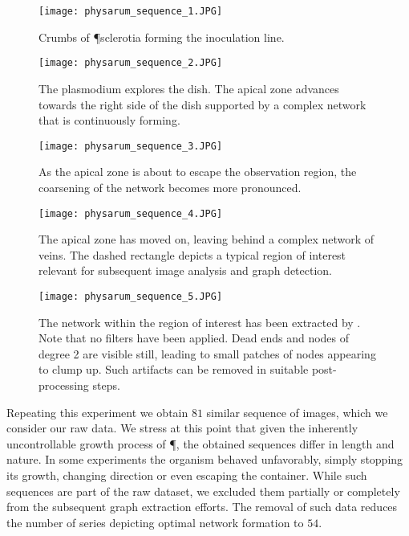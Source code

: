 	\begin{figure}
		\centering
		\texttt{[image: physarum\_sequence\_1.JPG]}
		\caption[Crumbs of \P sclerotia forming an inoculation line.]{Crumbs of \P sclerotia forming the inoculation line.}
		\label{fig:sequence_1}
	\end{figure}

	\begin{figure}
		\centering
		\texttt{[image: physarum\_sequence\_2.JPG]}
		\caption[The apical zone advances.]{The plasmodium explores the dish. The apical zone advances towards the right side of the dish supported by a complex network that is continuously forming.}
		\label{fig:sequence_2}
	\end{figure}

	\begin{figure}
		\centering
		\texttt{[image: physarum\_sequence\_3.JPG]}
		\caption[The onset of network coarsening.]{As the apical zone is about to escape the observation region, the coarsening of the network becomes more pronounced.}
		\label{fig:sequence_3}
	\end{figure}

	\begin{figure}
		\centering
		\texttt{[image: physarum\_sequence\_4.JPG]}
		\caption[A complex network of veins within a region of interest.]{The apical zone has moved on, leaving behind a complex network of veins. The dashed rectangle depicts a typical region of interest relevant for subsequent image analysis and graph detection.}
		\label{fig:sequence_4}
	\end{figure}

	\begin{figure}
		\centering
		\texttt{[image: physarum\_sequence\_5.JPG]}
		\caption[Graph extracted from the sample region of interest.]{The network within the region of interest has been extracted by \NEFI. Note that no filters have been applied. Dead ends and nodes of degree 2 are visible still, leading to small patches of nodes appearing to clump up. Such artifacts can be removed in suitable post-processing steps.}
		\label{fig:sequence_5}
	\end{figure}

	Repeating this experiment we obtain $81$ similar sequence of images, which we consider our raw data. We stress at this point that given the inherently uncontrollable growth process of \P, the obtained sequences differ in length and nature. In some experiments the organism behaved unfavorably, simply stopping its growth, changing direction or even escaping the container. While such sequences are part of the raw dataset, we excluded them partially or completely from the subsequent graph extraction efforts. The removal of such data reduces the number of series depicting optimal network formation to $54$.

